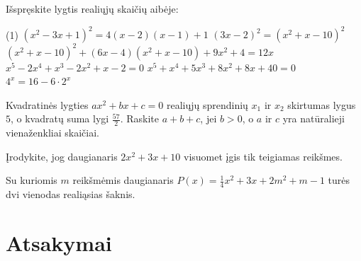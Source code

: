 \documentclass[12pt, a4paper]{scrartcl}
\begin{document}
\begin{problem}
Išspręskite lygtis realiųjų skaičių aibėje:
\begin{tasks}(1)
    \task $\left(x^2-3 x+1\right)^2=4(x-2)(x-1)+1$
    \task $(3x-2)^2=(x^2+x-10)^2$
    \task $(x^2+x-10)^2+(6x-4)(x^2+x-10)+9x ^{2} +4=12x$  
    \task $x^5-2x^4+x^3-2x^2+x-2 = 0$ 
    \task $x^5+x^4+5x^3+8x^2+8x+40=0$
    \task $4^x = 16-6\cdot 2^x$
\end{tasks}
\end{problem}

\begin{problem}
        Kvadratinės lygties $ax ^{2} +bx+c = 0$ realiųjų sprendinių $x_1$ ir $x_2$ skirtumas lygus $5$, o kvadratų suma lygi $\frac{57}{2}$. Raskite $a+b+c$, jei $b>0$, o $a$ ir $c$ yra natūralieji vienaženkliai skaičiai.  
\end{problem}

\begin{problem}
Įrodykite, jog daugianaris $2x ^{2} +3x+10$ visuomet įgis tik teigiamas reikšmes.  
\end{problem}

\begin{problem}
    Su kuriomis $m$ reikšmėmis daugianaris $P(x) =  \frac{1}{4} x ^{2} +3x+2m ^{2} +m-1$ turės dvi vienodas realiąsias šaknis.  
\end{problem}



\newpage
\section{Atsakymai}
\end{document}

